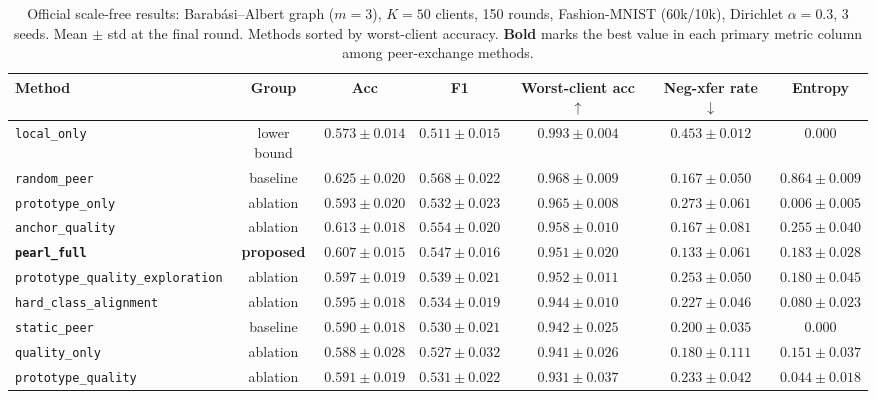 \documentclass[conference]{IEEEtran}
\begin{document}
\begin{table}[t]
\centering
\caption{Official scale-free results: Barab\'{a}si--Albert graph ($m=3$), $K=50$ clients, 150 rounds, Fashion-MNIST (60k/10k), Dirichlet $\alpha=0.3$, 3 seeds. Mean $\pm$ std at the final round. Methods sorted by worst-client accuracy. \textbf{Bold} marks the best value in each primary metric column among peer-exchange methods.}
\label{tab:sf_results}
\renewcommand{\arraystretch}{1.18}
\setlength{\tabcolsep}{4pt}
\begin{tabular}{lcccccc}
\toprule
\textbf{Method} & \textbf{Group} & \textbf{Acc} & \textbf{F1} & \textbf{Worst-client acc} $\uparrow$ & \textbf{Neg-xfer rate} $\downarrow$ & \textbf{Entropy} \\
\midrule
\texttt{local\_only}                     & lower bound & $0.573\pm0.014$ & $0.511\pm0.015$ & $0.993\pm0.004$ & $0.453\pm0.012$ & $0.000$ \\
\texttt{random\_peer}                    & baseline    & $0.625\pm0.020$ & $0.568\pm0.022$ & $0.968\pm0.009$ & $0.167\pm0.050$ & $0.864\pm0.009$ \\
\texttt{prototype\_only}                 & ablation    & $0.593\pm0.020$ & $0.532\pm0.023$ & $0.965\pm0.008$ & $0.273\pm0.061$ & $0.006\pm0.005$ \\
\texttt{anchor\_quality}                 & ablation    & $0.613\pm0.018$ & $0.554\pm0.020$ & $0.958\pm0.010$ & $0.167\pm0.081$ & $0.255\pm0.040$ \\
\textbf{\texttt{pearl\_full}}            & \textbf{proposed} & $0.607\pm0.015$ & $0.547\pm0.016$ & $\mathbf{0.951\pm0.020}$ & $\mathbf{0.133\pm0.061}$ & $0.183\pm0.028$ \\
\texttt{prototype\_quality\_exploration} & ablation    & $0.597\pm0.019$ & $0.539\pm0.021$ & $0.952\pm0.011$ & $0.253\pm0.050$ & $0.180\pm0.045$ \\
\texttt{hard\_class\_alignment}          & ablation    & $0.595\pm0.018$ & $0.534\pm0.019$ & $0.944\pm0.010$ & $0.227\pm0.046$ & $0.080\pm0.023$ \\
\texttt{static\_peer}                    & baseline    & $0.590\pm0.018$ & $0.530\pm0.021$ & $0.942\pm0.025$ & $0.200\pm0.035$ & $0.000$ \\
\texttt{quality\_only}                   & ablation    & $0.588\pm0.028$ & $0.527\pm0.032$ & $0.941\pm0.026$ & $0.180\pm0.111$ & $0.151\pm0.037$ \\
\texttt{prototype\_quality}              & ablation    & $0.591\pm0.019$ & $0.531\pm0.022$ & $0.931\pm0.037$ & $0.233\pm0.042$ & $0.044\pm0.018$ \\
\bottomrule
\end{tabular}
\end{table}
\end{document}
